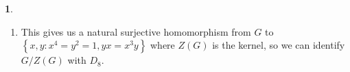 \documentclass[12pt]{article}
\theoremstyle{definition}
\newtheorem{ex}{}
\newenvironment{exercise}[1]{
	\renewcommand{\theex}{#1}
	\begin{ex}
		}{\end{ex}}
\begin{document}
\begin{exercise}{8}
\begin{enumerate}[label=(\alph*)]
		      When $b = 1$, we can do a similar calculation when $d = 1$ to get \begin{align*}
			           & x^ayx^cy = x^cyx^ay       \\
			      \iff & x^{a+3c}y^2 = x^{c+3a}y^2 \\
			      \iff & x^{a+3c} = x^{c+3a}       \\
			      \iff & x^{2c} = x^{2a}.
		      \end{align*}
		      Since this is dependent on the value of $c$, we conclude that when $b=1$, $x^ay$ does not commute with every element, and thus $Z(G) = \left\lbrace 1, x^4 \right\rbrace$.
		\item This gives us a natural surjective homomorphism from $G$ to $\left\lbrace x, y : x^4 = y^2 = 1, yx=x^3y \right\rbrace$ where $Z(G)$ is the kernel, so we can identify $G/Z(G)$ with $D_8$.
	\end{enumerate}
\end{exercise}
\end{document}
